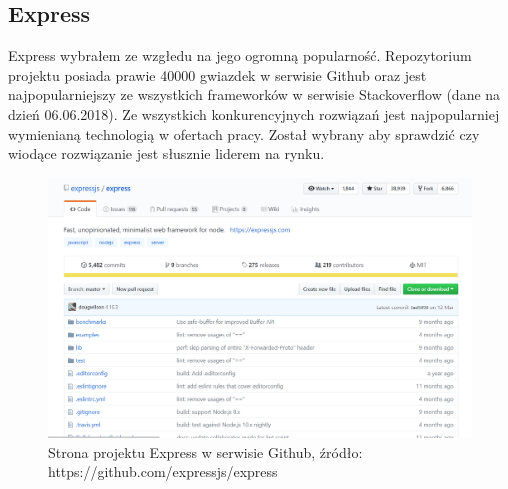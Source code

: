\documentclass[12pt]{report}
\begin{document}
    \subsection{Express}
      Express wybrałem ze wzgłedu na jego ogromną popularność.
      Repozytorium projektu posiada prawie 40000 gwiazdek w serwisie Github oraz jest najpopularniejszy ze wszystkich frameworków w serwisie Stackoverflow (dane na dzień 06.06.2018).
      Ze wszystkich konkurencyjnych rozwiązań jest najpopularniej wymienianą technologią w ofertach pracy.
      Został wybrany aby sprawdzić czy wiodące rozwiązanie jest słusznie liderem na rynku.
      \begin{figure}[!hb]
        \centering
        \includegraphics[width=\textwidth,height=\textheight,keepaspectratio]{express.png} 
        \caption{Strona projektu Express w serwisie Github, źródło: https://github.com/expressjs/express}
      \end{figure}
\end{document}
